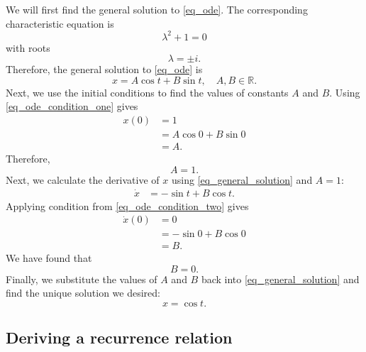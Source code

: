 We will first find the general solution to \autoref{eq_ode}. The corresponding characteristic equation is
\[
  \lambda^2 + 1 = 0
\]
with roots
\[
  \lambda = \pm i.
\]
Therefore, the general solution to \autoref{eq_ode} is
\begin{equation}
  x = A \cos t + B \sin t, \quad A, B \in \mathbb{R}.
  \label{eq_general_solution}
\end{equation}
Next, we use the initial conditions to find the values of constants $A$ and $B$. Using \autoref{eq_ode_condition_one} gives
\begin{align*}
  x(0) &= 1 \\
      &= A \cos 0 + B \sin 0 \\
      &= A.
\end{align*}
Therefore,
\[
  A = 1.
\]
Next, we calculate the derivative of $x$ using \autoref{eq_general_solution} and $A=1$:
\begin{align*}
  \dot{x} &= -\sin t + B \cos t.
\end{align*}
Applying condition from \autoref{eq_ode_condition_two} gives
\begin{align*}
  \dot{x}(0) &= 0 \\
      &= -\sin 0 + B \cos 0 \\
      &= B.
\end{align*}
We have found that
\[
  B = 0.
\]
Finally, we substitute the values of $A$ and $B$ back into \autoref{eq_general_solution} and find the unique solution we desired:
\[
  \boxed{x = \cos t.}
\]


\subsection{Deriving a recurrence relation}

